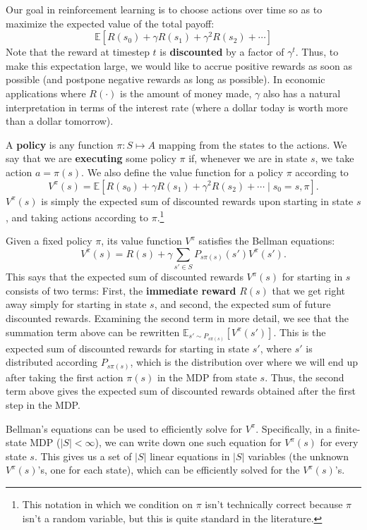 Our goal in reinforcement learning is to choose actions over time so as to
maximize the expected value of the total payoff:
\[
\mathbb E \left[R(s_0) + \gamma R(s_1) + \gamma^2 R(s_2) + \cdots\right] %
\]
Note that the reward at timestep $t$ is \textbf{discounted} by a factor of $\gamma^t$. Thus, to
make this expectation large, we would like to accrue positive rewards as soon
as possible (and postpone negative rewards as long as possible). In economic
applications where $R(\cdot)$ is the amount of money made, $\gamma$ also has a natural
interpretation in terms of the interest rate (where a dollar today is worth
more than a dollar tomorrow).

A \textbf{policy} is any function $\pi : S \mapsto A$ mapping from the states to the
actions. We say that we are \textbf{executing} some policy $\pi$ if, whenever we are
in state $s$, we take action $a = \pi(s)$. We also define the value function for
a policy $\pi$ according to
\[
    V^\pi(s) = \mathbb E \left[R(s_0) + \gamma R(s_1 ) + \gamma^2 R(s_2) + \cdots \mid s_0 = s, \pi \right].
\]
$V^\pi(s)$ is simply the expected sum of discounted rewards upon starting in
state $s$, and taking actions according to $\pi$.\footnote{
This notation in which we condition on $\pi$ isn't technically correct because $\pi$ isn't a
random variable, but this is quite standard in the literature.}

Given a fixed policy $\pi$, its value function $V^\pi$ satisfies the Bellman equations:
\[
    V^\pi(s) = R(s) + \gamma \sum_{s' \in S} P_{s\pi(s)}(s')V^\pi(s').
\]
This says that the expected sum of discounted rewards $V^\pi(s)$ for starting
in $s$ consists of two terms: First, the \textbf{immediate reward} $R(s)$ that we get
right away simply for starting in state $s$, and second, the expected sum of
future discounted rewards. Examining the second term in more detail, we
see that the summation term above can be rewritten $\mathbb E_{s'\sim P_{s\pi(s)}}[V^\pi(s')]$. This
is the expected sum of discounted rewards for starting in state $s'$, where $s'$
is distributed according $P_{s\pi(s)}$, which is the distribution over where we will
end up after taking the first action $\pi(s)$ in the MDP from state $s$. Thus, the
second term above gives the expected sum of discounted rewards obtained
after the first step in the MDP.

Bellman's equations can be used to efficiently solve for $V^\pi$. Specifically,
in a finite-state MDP ($|S| < \infty$), we can write down one such equation for $V^\pi(s)$
for every state $s$. This gives us a set of $|S|$ linear equations in $|S|$
variables (the unknown $V^\pi(s)$'s, one for each state), which can be efficiently
solved for the $V^\pi(s)$'s.

